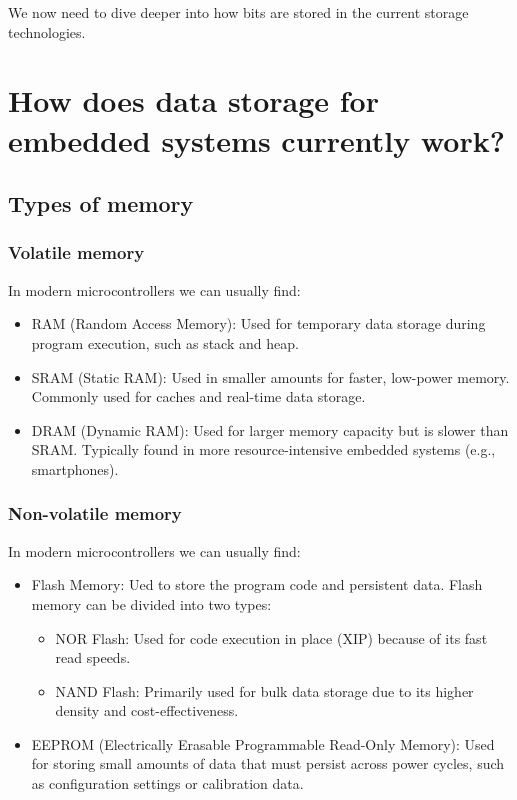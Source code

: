 \documentclass[aspectratio=169]{beamer}
\begin{document}
\begin{frame}
  We now need to dive deeper into how bits are stored in the current storage technologies.
\end{frame}

\section{How does data storage for embedded systems currently work?}
\subsection{Types of memory}

\begin{frame}
  \frametitle{Volatile memory}
  In modern microcontrollers we can usually find: \pause
  \begin{itemize}
    \item RAM (Random Access Memory): Used for temporary data storage during program execution, such as stack and heap. \pause
    \item SRAM (Static RAM): Used in smaller amounts for faster, low-power memory. Commonly used for caches and real-time data storage. \pause
    \item DRAM (Dynamic RAM): Used for larger memory capacity but is slower than SRAM. Typically found in more resource-intensive embedded systems (e.g., smartphones).
  \end{itemize}
\end{frame}

\begin{frame}
  \frametitle{Non-volatile memory}
  In modern microcontrollers we can usually find:
  \begin{itemize}
    \item Flash Memory: Ued to store the program code and persistent data. Flash memory can be divided into two types: \pause
    \begin{itemize}
      \item NOR Flash: Used for code execution in place (XIP) because of its fast read speeds.
      \item NAND Flash: Primarily used for bulk data storage due to its higher density and cost-effectiveness. \pause
    \end{itemize}
    \item EEPROM (Electrically Erasable Programmable Read-Only Memory): Used for storing small amounts of data that must persist across power cycles, such as configuration settings or calibration data.
  \end{itemize}
\end{frame}
\end{document}
